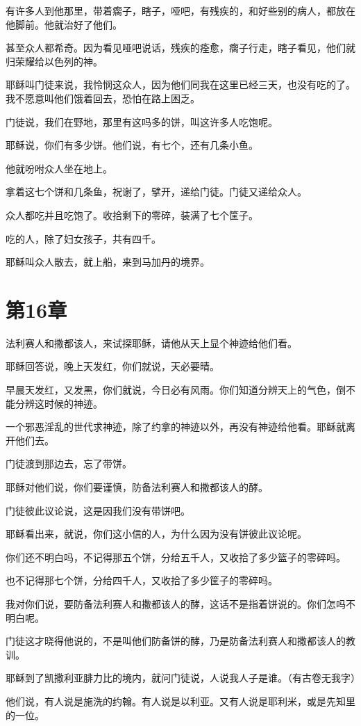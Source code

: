 \documentclass[12pt,oneside]{book}
\begin{document}
有许多人到他那里，带着瘸子，瞎子，哑吧，有残疾的，和好些别的病人，都放在他脚前。他就治好了他们。

甚至众人都希奇。因为看见哑吧说话，残疾的痊愈，瘸子行走，瞎子看见，他们就归荣耀给以色列的神。

耶稣叫门徒来说，我怜悯这众人，因为他们同我在这里已经三天，也没有吃的了。我不愿意叫他们饿着回去，恐怕在路上困乏。

门徒说，我们在野地，那里有这吗多的饼，叫这许多人吃饱呢。

耶稣说，你们有多少饼。他们说，有七个，还有几条小鱼。

他就吩咐众人坐在地上。

拿着这七个饼和几条鱼，祝谢了，擘开，递给门徒。门徒又递给众人。

众人都吃并且吃饱了。收拾剩下的零碎，装满了七个筐子。

吃的人，除了妇女孩子，共有四千。

耶稣叫众人散去，就上船，来到马加丹的境界。

\chapter{第16章}
法利赛人和撒都该人，来试探耶稣，请他从天上显个神迹给他们看。

耶稣回答说，晚上天发红，你们就说，天必要晴。

早晨天发红，又发黑，你们就说，今日必有风雨。你们知道分辨天上的气色，倒不能分辨这时候的神迹。

一个邪恶淫乱的世代求神迹，除了约拿的神迹以外，再没有神迹给他看。耶稣就离开他们去。

门徒渡到那边去，忘了带饼。

耶稣对他们说，你们要谨慎，防备法利赛人和撒都该人的酵。

门徒彼此议论说，这是因我们没有带饼吧。

耶稣看出来，就说，你们这小信的人，为什么因为没有饼彼此议论呢。

你们还不明白吗，不记得那五个饼，分给五千人，又收拾了多少篮子的零碎吗。

也不记得那七个饼，分给四千人，又收拾了多少筐子的零碎吗。

我对你们说，要防备法利赛人和撒都该人的酵，这话不是指着饼说的。你们怎吗不明白呢。

门徒这才晓得他说的，不是叫他们防备饼的酵，乃是防备法利赛人和撒都该人的教训。

耶稣到了凯撒利亚腓力比的境内，就问门徒说，人说我人子是谁。（有古卷无我字）

他们说，有人说是施洗的约翰。有人说是以利亚。又有人说是耶利米，或是先知里的一位。
\end{document}
